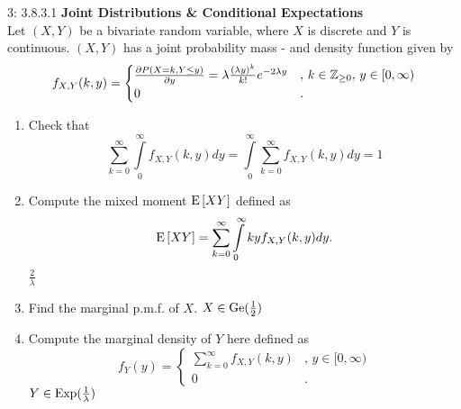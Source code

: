 \documentclass[a4paper,twoside=false,abstract=false,numbers=noenddot,
titlepage=false,headings=small,parskip=half,version=last]{scrartcl}
\begin{document}

\begin{exercise}{3: 3.8.3.1}
    \textbf{Joint Distributions \& Conditional Expectations} \\
    Let $(X, Y)$ be a bivariate random variable, where $X$ is discrete and $Y$
    is continuous. $(X, Y)$ has a joint probability mass - and density function
    given by
    \begin{equation}
        f_{X,Y}(k, y) = \begin{cases}
            \frac{\partial{P(X=k, Y\le y)}}{\partial{y}} =
            \lambda\frac{(\lambda y)^k}{k!}e^{-2\lambda y}
                    &,\, k\in\mathbb{Z}_{\ge 0},\, y\in [0, \infty) \\
            0       &.
        \end{cases}
    \end{equation}
    \begin{enumerate}
        \item Check that
            \begin{equation}
                \sum\limits_{k=0}^\infty \int\limits_0^\infty f_{X,Y}(k,y)dy =
                \int\limits_0^\infty \sum\limits_{k=0}^\infty f_{X,Y}(k,y)dy = 1
            \end{equation}

        \item \label{itm:b} Compute the mixed moment ${\rm E}\,[XY]$ defined as
            \begin{equation}
                {\rm E}\,[XY] =
                \sum\limits_{k=0}^\infty \int\limits_0^\infty kyf_{X,Y}(k,y)dy.
            \end{equation}
            \Answer $\frac{2}{\lambda}$

        \item Find the marginal p.m.f. of $X$.
            \Answer $X\in\text{Ge}(\frac{1}{2})$

        \item Compute the marginal density of $Y$ here defined as
            \begin{equation}
                f_Y(y) = \begin{cases}
                    \sum\limits_{k=0}^\infty f_{X,Y}(k,y) &, \, y\in[0,\infty) \\
                     0                                    &.
                \end{cases}
            \end{equation}
            \Answer $Y\in\text{Exp}(\frac{1}{\lambda})$


\end{enumerate}
\end{exercise}
\end{document}
